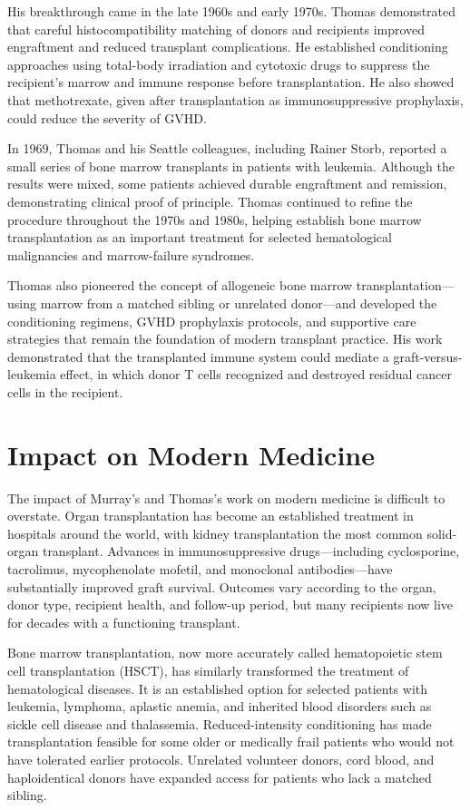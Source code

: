 His breakthrough came in the late 1960s and early 1970s. Thomas demonstrated that careful histocompatibility matching of donors and recipients improved engraftment and reduced transplant complications. He established conditioning approaches using total-body irradiation and cytotoxic drugs to suppress the recipient's marrow and immune response before transplantation. He also showed that methotrexate, given after transplantation as immunosuppressive prophylaxis, could reduce the severity of GVHD.

In 1969, Thomas and his Seattle colleagues, including Rainer Storb, reported a small series of bone marrow transplants in patients with leukemia. Although the results were mixed, some patients achieved durable engraftment and remission, demonstrating clinical proof of principle. Thomas continued to refine the procedure throughout the 1970s and 1980s, helping establish bone marrow transplantation as an important treatment for selected hematological malignancies and marrow-failure syndromes.

Thomas also pioneered the concept of allogeneic bone marrow transplantation---using marrow from a matched sibling or unrelated donor---and developed the conditioning regimens, GVHD prophylaxis protocols, and supportive care strategies that remain the foundation of modern transplant practice. His work demonstrated that the transplanted immune system could mediate a graft-versus-leukemia effect, in which donor T cells recognized and destroyed residual cancer cells in the recipient.

\section{Impact on Modern Medicine}

The impact of Murray's and Thomas's work on modern medicine is difficult to overstate. Organ transplantation has become an established treatment in hospitals around the world, with kidney transplantation the most common solid-organ transplant. Advances in immunosuppressive drugs---including cyclosporine, tacrolimus, mycophenolate mofetil, and monoclonal antibodies---have substantially improved graft survival. Outcomes vary according to the organ, donor type, recipient health, and follow-up period, but many recipients now live for decades with a functioning transplant.

Bone marrow transplantation, now more accurately called hematopoietic stem cell transplantation (HSCT), has similarly transformed the treatment of hematological diseases. It is an established option for selected patients with leukemia, lymphoma, aplastic anemia, and inherited blood disorders such as sickle cell disease and thalassemia. Reduced-intensity conditioning has made transplantation feasible for some older or medically frail patients who would not have tolerated earlier protocols. Unrelated volunteer donors, cord blood, and haploidentical donors have expanded access for patients who lack a matched sibling.

